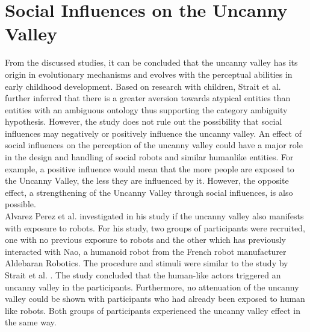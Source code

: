 \section{Social Influences on the Uncanny Valley}
From the discussed studies, it can be concluded that the uncanny valley has its origin in evolutionary mechanisms and evolves with the perceptual abilities in early childhood development. Based on research with children, Strait et al. \cite{childrens_responding} further inferred that there is a greater aversion towards atypical entities than entities with an ambiguous ontology thus supporting the category ambiguity hypothesis. However, the study does not rule out the possibility that social influences may negatively or positively influence the uncanny valley. An effect of social influences on the perception of the uncanny valley could have a major role in the design and handling of social robots and similar humanlike entities. For example, a positive influence would mean that the more people are exposed to the Uncanny Valley, the less they are influenced by it. However, the opposite effect, a strengthening of the Uncanny Valley through social influences, is also possible.\\
Alvarez Perez et al. \cite{prior_exposure_robots} investigated in his study if the uncanny valley also manifests with exposure to robots. For his study, two groups of participants were recruited, one with no previous exposure to robots and the other which has previously interacted with Nao, a humanoid robot from the French robot manufacturer Aldebaran Robotics. The procedure and stimuli were similar to the study by Strait et al. \cite{childrens_responding}. The study concluded that the human-like actors triggered an uncanny valley in the participants. Furthermore, no attenuation of the uncanny valley could be shown with participants who had already been exposed to human like robots. Both groups of participants experienced the uncanny valley effect in the same way.




